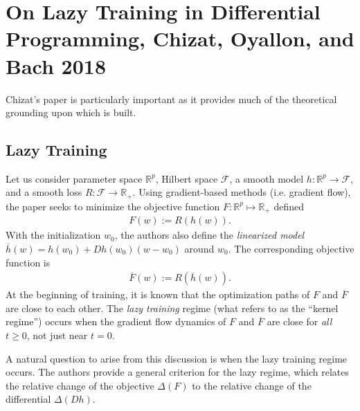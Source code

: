 \documentclass{article}
\begin{document}
\section{On Lazy Training in Differential Programming, Chizat, Oyallon, and Bach 2018}

Chizat's paper is particularly important as it provides much of the theoretical grounding upon which \cite{woodworth2020kernel} is built. 

\subsection{Lazy Training}
Let us consider parameter space $\mathbb{R}^p$, Hilbert space $\mathcal{F}$, a smooth model $h: \mathbb{R}^p \rightarrow \mathcal{F}$, and a smooth loss $R: \mathcal{F} \rightarrow \mathbb{R}_+$. Using gradient-based methods (i.e. gradient flow), the paper seeks to minimize the objective function $F: \mathbb{R}^p \mapsto \mathbb{R}_+$ defined
\begin{align*}
    F(w) := R(h(w)).
\end{align*}
With the initialization $w_0$, the authors also define the \textit{linearized model} $\overline{h}(w) = h(w_0) + Dh(w_0)(w - w_0)$ around $w_0$. The corresponding objective function is 
\begin{align*}
    \overline{F}(w) := R(\overline{h}(w)).
\end{align*}
At the beginning of training, it is known that the optimization paths of $F$ and $\overline{F}$ are close to each other. The \textit{lazy training} regime (what \cite{woodworth2020kernel} refers to as the \enquote{kernel regime}) occurs when the gradient flow dynamics of $F$ and $\overline{F}$ are close for \textit{all} $t \geq 0$, not just near $t = 0$.

A natural question to arise from this discussion is when the lazy training regime occurs. The authors provide a general criterion for the lazy regime, which relates the relative change of the objective $\Delta(F)$ to the relative change of the differential $\Delta(Dh)$.
\end{document}
